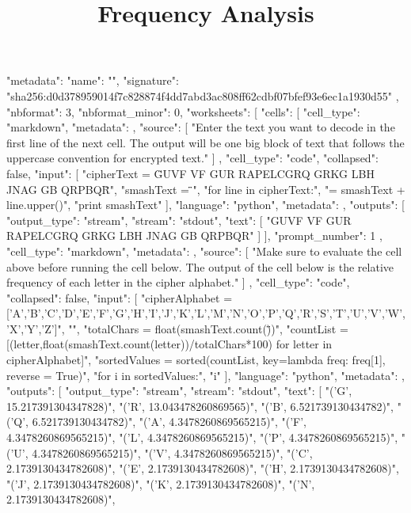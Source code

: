 \documentclass[handout]{ximera}
\title{Frequency Analysis}
\begin{document}
\begin{python}
{
 "metadata": {
  "name": "",
  "signature": "sha256:d0d378959014f7c828874f4dd7abd3ac808ff62cdbf07bfef93e6ec1a1930d55"
 },
 "nbformat": 3,
 "nbformat_minor": 0,
 "worksheets": [
  {
   "cells": [
    {
     "cell_type": "markdown",
     "metadata": {},
     "source": [
      "Enter the text you want to decode in the first line of the next cell.  The output will be one big block of text that follows the uppercase convention for encrypted text."
     ]
    },
    {
     "cell_type": "code",
     "collapsed": false,
     "input": [
      "cipherText = \"GUVF VF GUR RAPELCGRQ GRKG LBH JNAG GB QRPBQR\"\n",
      "smashText = \"\"\n",
      "for line in cipherText:\n",
      "\tsmashText = smashText + line.upper()\n",
      "print smashText"
     ],
     "language": "python",
     "metadata": {},
     "outputs": [
      {
       "output_type": "stream",
       "stream": "stdout",
       "text": [
        "GUVF VF GUR RAPELCGRQ GRKG LBH JNAG GB QRPBQR\n"
       ]
      }
     ],
     "prompt_number": 1
    },
    {
     "cell_type": "markdown",
     "metadata": {},
     "source": [
      "Make sure to evaluate the cell above before running the cell below.  The output of the cell below is the relative frequency of each letter in the cipher alphabet."
     ]
    },
    {
     "cell_type": "code",
     "collapsed": false,
     "input": [
      "cipherAlphabet = ['A','B','C','D','E','F','G','H','I','J','K','L','M','N','O','P','Q','R','S','T','U','V','W','X','Y','Z']\n",
      "\n",
      "totalChars = float(smashText.count(\"\"))\n",
      "countList = [(letter,float(smashText.count(letter))/totalChars*100) for letter in cipherAlphabet]\n",
      "sortedValues = sorted(countList, key=lambda freq: freq[1], reverse = True)\n",
      "for i in sortedValues:\n",
      "\tprint i"
     ],
     "language": "python",
     "metadata": {},
     "outputs": [
      {
       "output_type": "stream",
       "stream": "stdout",
       "text": [
        "('G', 15.217391304347828)\n",
        "('R', 13.043478260869565)\n",
        "('B', 6.521739130434782)\n",
        "('Q', 6.521739130434782)\n",
        "('A', 4.3478260869565215)\n",
        "('F', 4.3478260869565215)\n",
        "('L', 4.3478260869565215)\n",
        "('P', 4.3478260869565215)\n",
        "('U', 4.3478260869565215)\n",
        "('V', 4.3478260869565215)\n",
        "('C', 2.1739130434782608)\n",
        "('E', 2.1739130434782608)\n",
        "('H', 2.1739130434782608)\n",
        "('J', 2.1739130434782608)\n",
        "('K', 2.1739130434782608)\n",
        "('N', 2.1739130434782608)\n",
}}}}
\end{python}
\end{document}
